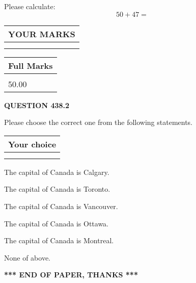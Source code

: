 \documentclass[12pt]{article}
\begin{document}
  
 
Please calculate:
\begin{equation}
50 +  %
47 = \nonumber
\end{equation}
 

 

 
  
\vspace{0.2in}
  
\noindent\begin{tabular}{|l|}
\hline
 YOUR MARKS  \\
\hline
 \\ 
 \\ 
\hline
\end{tabular}
\hspace{0.05in} \begin{tabular}{|l|}
\hline
 Full Marks  \\
\hline
 \\ 
50.00 \\
\hline
\end{tabular}
{\textbf{\Large{QUESTION
438.2 
}}}
  
  
Please choose the correct one from the following statements.
  
  
\noindent\hspace{3.0in} \begin{tabular}{|l|}
\hline
Your choice \\
\hline
 \\ 
 \\ 
\hline
\end{tabular}
  
  
 
 
The capital of Canada is Calgary.
 
 
The capital of Canada is Toronto.
 
 
The capital of Canada is Vancouver.
 
 
The capital of Canada is Ottawa.
 
 
The capital of Canada is Montreal.
 
 
 None of above.
 
 
   
   
 \vspace{0.2in}
 
   
   
   
   
\vspace{1.0in} 
{\textbf{\large{ *** END OF PAPER, THANKS *** }}} 
   
\end{document}
